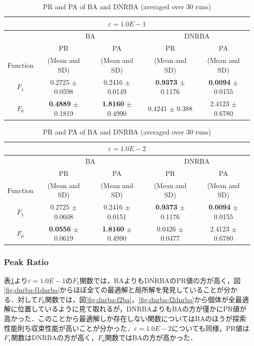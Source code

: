 \documentclass[a4j,11pt]{jarticle}
\begin{document}
\begin{table}[h]
\caption{PR and PA of BA and DNRBA (averaged over 30 runs)}
\begin{center}
\begin{tabular}{c|c|c|c|c}
\multicolumn{5}{c}{$\varepsilon = 1.0E-1$} \\
\hline
\multicolumn{1}{c|}{} & \multicolumn{2}{c|}{BA} & \multicolumn{2}{c}{DNRBA} \\
\hline
 & PR & PA & PR & PA \\

Function & (Mean and SD) & (Mean and SD) & (Mean and SD) & (Mean and SD) \\
\hline
$F_1 $ & 0.2725 $\pm$ 0.0598 & 0.2416 $\pm$ 0.0149 & {\bf 0.9373} $\pm$ 0.1176  & {\bf 0.0094} $\pm$ 0.0155  \\
\hline
$F_6 $ & {\bf 0.4889} $\pm$ 0.1819 & {\bf 1.8160} $\pm$ 0.4990 & 0.4241 $\pm$ 0.388 & 2.4123 $\pm$ 0.6780 \\
\hline

\end{tabular}
\label{tab:dnrba-1}
\end{center}
\end{table}

\begin{table}[h]
\caption{PR and PA of BA and DNRBA (averaged over 30 runs)}
\begin{center}
\begin{tabular}{c|c|c|c|c}
\multicolumn{5}{c}{$\varepsilon = 1.0E-2$} \\
\hline
\multicolumn{1}{c|}{} & \multicolumn{2}{c|}{BA} & \multicolumn{2}{c}{DNRBA} \\
\hline
 & PR & PA & PR & PA \\

Function & (Mean and SD) & (Mean and SD) & (Mean and SD) & (Mean and SD) \\
\hline
$F_1 $ & 0.2725 $\pm$ 0.0608 & 0.2416 $\pm$ 0.0151 & {\bf 0.9373} $\pm$ 0.1176  & {\bf 0.0094} $\pm$ 0.0155  \\
\hline
$F_6 $ & {\bf 0.0556} $\pm$ 0.0619 & {\bf 1.8160} $\pm$ 0.4990 & 0.0426 $\pm$ 0.0477 & 2.4123 $\pm$ 0.6780 \\
\hline

\end{tabular}
\label{tab:dnrba-2}
\end{center}
\end{table}

\subsubsection{Peak Ratio}
表\ref{tab:dnrba-1}より$\varepsilon=1.0E-1$の$F_1$関数では，BAよりもDNRBAのPR値の方が高く，図\ref{fig:dnrba-f1dnrba}からほぼ全ての最適解と局所解を発見していることが分かる．対して$F_6$関数では，図\ref{fig:dnrba-f2ba}，\ref{fig:dnrba-f2dnrba}から個体が全最適解に位置しているように見て取れるが，DNRBAよりもBAの方が僅かにPR値が高かった．このことから最適解しか存在しない関数についてはBAのほうが探索性能則ち収束性能が高いことが分かった．$\varepsilon=1.0E-2$についても同様，PR値は$F_1$関数はDNRBAの方が高く，$F_6$関数ではBAの方が高かった．
\end{document}
